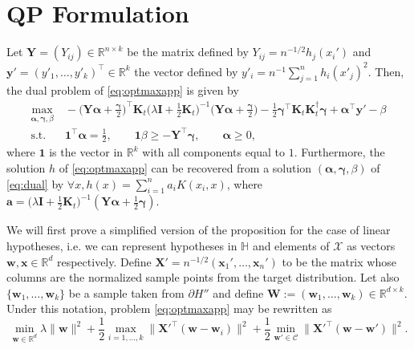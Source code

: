 \documentclass[twoside,11pt]{article}
\def\Rset{\mathbb{R}}
\def\Hset{\mathbb{H}}
\newcommand{\cX}{{\mathcal X}}
\newcommand{\mat}[1]{{\mathbf #1}}
\newcommand{\1}{\mat{1}}
\newcommand{\Kt}{\mat{K}_{t}}
\newcommand{\w}{\mat{w}}
\newcommand{\x}{\mat{x}}
\newcommand{\y}{\mat{y}}
\newcommand{\I}{\mat{I}}
\newcommand{\X}{\mat{X}}
\begin{document}
\section{QP  Formulation}
\label{app:qpformula}

\begin{proposition}
Let $\mat Y =(Y_{ij}) \in \Rset^{n \times k}$ be the
matrix defined by
$Y_{ij} = n^{-1/2} h_j(x_i')$ and $\y' = (y'_1,\ldots, y'_k)^\top \in \Rset^k $
the vector defined by $y'_i = n^{-1}\sum_{j=1}^n h_i(x'_j)^2$.
Then, the dual problem of \eqref{eq:optmaxapp} is given by
\begin{align}
\label{eq:dual}
\max_{\bm \alpha, \bm \gamma, \beta} & \ -\Big(\mat Y \bm \alpha + \frac{\bm
  \gamma}{2} \Big)^\top \Kt\Big(\lambda \I + \frac{1}{2}\Kt\Big)^{-1}
\Big(\mat Y \bm \alpha  + \frac{\bm \gamma}{2}\Big)
-\frac{1}{2} \bm \gamma^\top \Kt \Kt^\dag \bm \gamma +
\bm \alpha^\top \y' - \beta\\
\text{s.t.} & \ \1^\top \bm \alpha = \frac{1}{2}, \qquad  \1
\beta \geq -\mat Y^\top \bm \gamma, \qquad \bm \alpha\geq
0, \nonumber
\end{align}
where $\1$ is the vector in $\Rset^k$ with all components equal to
$1$. Furthermore, the solution $h$ of \eqref{eq:optmaxapp} can be
recovered from a solution $(\bm \alpha, \bm \gamma, \beta)$ of
\eqref{eq:dual} by $\forall x, h(x) =\sum_{i = 1}^n a_i K(x_i, x)$,
where $\bm a = \big(\lambda \I + \frac{1}{2}\Kt)^{-1}(\mat Y \bm
\alpha + \frac{1}{2}\bm \gamma)$.
\end{proposition}

We will first prove a simplified version of the proposition for the
case of linear hypotheses, i.e. we can represent hypotheses in $\Hset$
and elements of $\cX$ as vectors $\w, \x \in \Rset^d$
respectively. Define $\X' = n^{-1/2} (\x_1', \ldots, \x_n')$ to be the
matrix whose columns are the normalized sample points from the target
distribution. Let also $\{\w_1, \ldots, \w_k\}$ be a sample taken from
$\partial H''$ and define
$\bm W := (\w_1, \ldots, \w_k) \in \Rset^{d  \times k}$.
 Under this notation, problem \eqref{eq:optmaxapp} may be
rewritten as
\begin{equation}
\label{eq:linoptimization}
\min_{\w \in \Rset^d} \lambda \|\w\|^2 + \frac{1}{2} \max_{i =1,
  \dots, k} \|\X'^\top(\w - \w_i)\|^2 + \frac{1}{2} \min_{\w' \in
  \mathcal C} \|\X'^\top (\w - \w')\|^2.
\end{equation}
\end{document}
